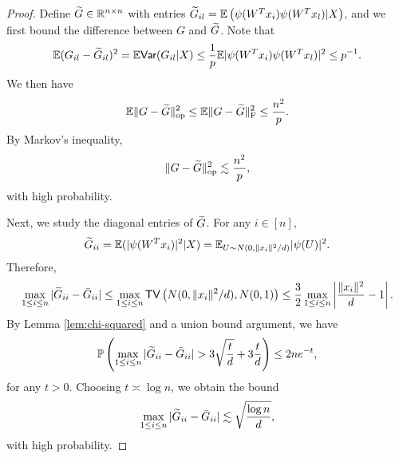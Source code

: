 \begin{proof}
Define $\widetilde{G}\in\mathbb{R}^{n\times n}$ with entries $\widetilde{G}_{il}=\mathbb{E}\left(\psi(W^Tx_i)\psi(W^Tx_l)|X\right)$, and we first bound the difference between $G$ and $\widetilde{G}$. Note that
$$\mathbb{E}(G_{il}-\widetilde{G}_{il})^2 = \mathbb{E}\textsf{Var}(G_{il}|X) \leq \frac{1}{p}\mathbb{E}|\psi(W^Tx_i)\psi(W^Tx_l)|^2 \leq p^{-1}.$$
We then have
$$
\mathbb{E}\|G-\widetilde{G}\|_{\rm op}^2 \leq \mathbb{E}\|G-\widetilde{G}\|_{\rm F}^2 \leq \frac{n^2}{p}.
$$
By Markov's inequality,
\begin{equation}
\opnorm{G-\wt{G}}^2 \lesssim \frac{n^2}{p}, \label{eq:G-G-tilde}
\end{equation}
with high probability.

Next, we study the diagonal entries of $\widetilde{G}$. For any $i\in[n]$,
$$\widetilde{G}_{ii}=\mathbb{E}(|\psi(W^Tx_i)|^2|X)=\mathbb{E}_{U\sim N(0,\|x_i\|^2/d)}|\psi(U)|^2.$$
Therefore,
$$\max_{1\leq i\leq n}|\widetilde{G}_{ii}-\bar{G}_{ii}|\leq \max_{1\leq i\leq n}{\sf TV}\left(N(0,\|x_i\|^2/d), N(0,1)\right)\leq\frac{3}{2}\max_{1\leq i\leq n}\left|\frac{\|x_i\|^2}{d}-1\right|.$$
By Lemma \ref{lem:chi-squared} and a union bound argument, we have
$$\mathbb{P}\left(\max_{1\leq i\leq n}|\wt{G}_{ii}-\bar{G}_{ii}|>3\sqrt{\frac{t}{d}}+3\frac{t}{d}\right)\leq 2ne^{-t},$$
for any $t>0$. Choosing $t\asymp\log n$, we obtain the bound
\begin{equation}
\max_{1\leq i\leq n}|\wt{G}_{ii}-\bar{G}_{ii}|\lesssim \sqrt{\frac{\log n}{d}}, \label{eq:G-diag}
\end{equation}
with high probability.


\end{proof}
